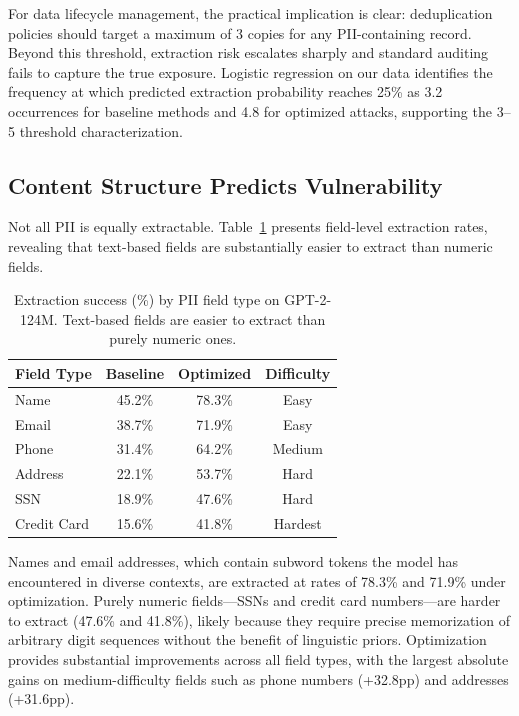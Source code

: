 \documentclass[conference]{IEEEtran}
\begin{document}
For data lifecycle management, the practical implication is clear: deduplication policies should target a maximum of 3 copies for any PII-containing record. Beyond this threshold, extraction risk escalates sharply and standard auditing fails to capture the true exposure. Logistic regression on our data identifies the frequency at which predicted extraction probability reaches 25\% as 3.2 occurrences for baseline methods and 4.8 for optimized attacks, supporting the 3--5 threshold characterization.

\subsection{Content Structure Predicts Vulnerability}

Not all PII is equally extractable. Table~\ref{tab:field} presents field-level extraction rates, revealing that text-based fields are substantially easier to extract than numeric fields.

\begin{table}[t]
\centering
\caption{Extraction success (\%) by PII field type on GPT-2-124M. Text-based fields are easier to extract than purely numeric ones.}
\label{tab:field}
\begin{tabular}{@{}lccc@{}}
\toprule
\textbf{Field Type} & \textbf{Baseline} & \textbf{Optimized} & \textbf{Difficulty} \\
\midrule
Name        & 45.2\% & 78.3\% & Easy    \\
Email       & 38.7\% & 71.9\% & Easy    \\
Phone       & 31.4\% & 64.2\% & Medium  \\
Address     & 22.1\% & 53.7\% & Hard    \\
SSN         & 18.9\% & 47.6\% & Hard    \\
Credit Card & 15.6\% & 41.8\% & Hardest \\
\bottomrule
\end{tabular}
\end{table}

Names and email addresses, which contain subword tokens the model has encountered in diverse contexts, are extracted at rates of 78.3\% and 71.9\% under optimization. Purely numeric fields---SSNs and credit card numbers---are harder to extract (47.6\% and 41.8\%), likely because they require precise memorization of arbitrary digit sequences without the benefit of linguistic priors. Optimization provides substantial improvements across all field types, with the largest absolute gains on medium-difficulty fields such as phone numbers (+32.8pp) and addresses (+31.6pp).
\end{document}
